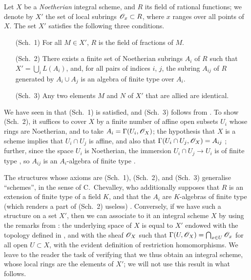\begin{env}[8.3.1]
\label{1.8.3.1}
Let $X$ be a \emph{Noetherian} integral scheme, and $R$ its field of rational functions;
we denote by $X'$ the set of local subrings $\mathscr{O}_x\subset R$, where $x$ ranges over all points of $X$.
The set $X'$ satisfies the following three conditions.
\begin{enumerate}
  \item[(Sch.~1)] For all $M\in X'$, $R$ is the field of fractions of $M$.
  \item[(Sch.~2)] There exists a finite set of Noetherian subrings $A_i$ of $R$ such that $X'=\bigcup_i L(A_i)$, and, for all pairs of indices $i$, $j$, the subring $A_{ij}$ of $R$ generated by $A_i\cup A_j$ is an algebra of finite type over $A_i$.
  \item[(Sch.~3)] Any two elements $M$ and $N$ of $X'$ that are allied are identical.
\end{enumerate}
\end{env}

We have seen in  that (Sch.~1) is satisfied, and (Sch.~3) follows from .
To show (Sch.~2), it suffices to cover $X$ by a finite number of affine open subsets $U_i$ whose rings are Noetherian, and to take $A_i=\Gamma(U_i,\mathscr{O}_X)$;
the hypothesis that $X$ is a scheme implies that $U_i\cap U_j$ is affine, and also that $\Gamma(U_i\cap U_j,\mathscr{O}_X)=A_{ij}$ ;
further, since the space $U_i$ is Noetherian, the immersion $U_i\cap U_j\to U_i$ is of finite type , so $A_{ij}$ is an $A_i$-algebra of finite type .

\begin{env}[8.3.2]
\label{1.8.3.2}
The structures whose axioms are (Sch.~1), (Sch.~2), and (Sch.~3) generalise ``schemes'', in the sense of C.~Chevalley, who additionally supposes that $R$ is an extension of finite type of a field $K$, and that the $A_i$ are $K$-algebras of finite type (which renders a part of (Sch.~2) useless) \cite{I-1}.
Conversely, if we have such a structure on a set $X'$, then we can associate to it an integral scheme $X$ by using the remarks from : the underlying space of $X$ is equal to $X'$ endowed with the topology defined in , and with the sheaf $\mathscr{O}_X$ such that $\Gamma(U,\mathscr{O}_X)=\bigcap_{x\in U}\mathscr{O}_x$ for all open $U\subset X$, with the evident definition of restriction homomorphisms.
We leave to the reader the task of verifying that we thus obtain an integral scheme, whose local rings are the elements of $X'$;
we will not use this result in what follows.
\end{env}

